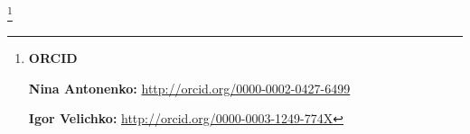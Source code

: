\RuDate



\bigskip



\makeentitle



\thanks{{\bf ORCID}



{\bf Nina Antonenko:} \url{http://orcid.org/0000-0002-0427-6499}



{\bf Igor Velichko:} \url{http://orcid.org/0000-0003-1249-774X}



}









\EngRef





